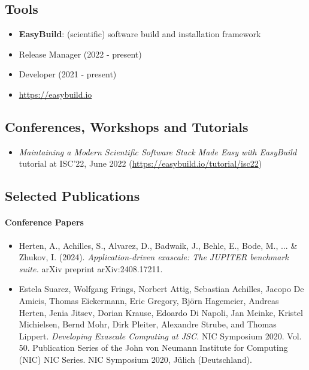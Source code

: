 \subsection*{Tools}

\begin{itemize}
\item[] \textbf{EasyBuild}: (scientific) software build and installation framework
\item[] Release Manager (2022 - present)
\item[] Developer (2021 - present)
\item[] \url{https://easybuild.io}
\end{itemize}

\subsection*{Conferences, Workshops and Tutorials}
\begin{itemize}
\item[] \emph{Maintaining a Modern Scientific Software Stack Made Easy with EasyBuild} tutorial at ISC'22, June 2022 (\url{https://easybuild.io/tutorial/isc22})
\end{itemize}

\subsection*{Selected Publications}

\paragraph{Conference Papers}

\begin{itemize}
\item[] Herten, A., Achilles, S., Alvarez, D., Badwaik, J., Behle, E., Bode, M., ... \& Zhukov, I. (2024). \emph{Application-driven exascale: The JUPITER benchmark suite.} arXiv preprint arXiv:2408.17211.
\item[] Estela Suarez, Wolfgang Frings, Norbert Attig, Sebastian Achilles, Jacopo De Amicis, Thomas
Eickermann, Eric Gregory, Björn Hagemeier, Andreas Herten, Jenia Jitsev, Dorian Krause,
Edoardo Di Napoli, Jan Meinke, Kristel Michielsen, Bernd Mohr, Dirk Pleiter, Alexandre
Strube, and Thomas Lippert. \emph{Developing Exascale Computing at JSC.} NIC Symposium
2020. Vol. 50. Publication Series of the John von Neumann Institute for Computing (NIC)
NIC Series. NIC Symposium 2020, Jülich (Deutschland).
\end{itemize}

